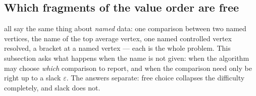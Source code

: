 
\subsection{Which fragments of the value order are free}\label{sec:wo}

 all say the same thing about \emph{named} data: one
comparison between two named vertices, the name of the top average vertex, one
named controlled vertex resolved, a bracket at a named vertex --- each is the
whole problem. This subsection asks what happens when the name is not given:
when the algorithm may choose \emph{which} comparison to report, and when the
comparison need only be right up to a slack $\varepsilon$. The answers separate:
free choice collapses the difficulty completely, and slack does not.

